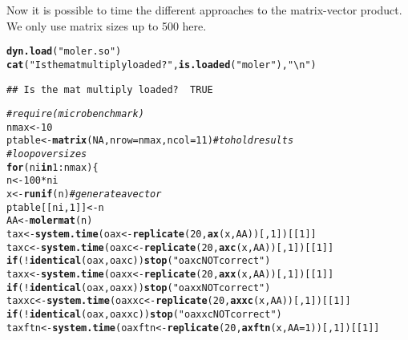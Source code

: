 \documentclass[10pt]{article}\usepackage[]{graphicx}\usepackage[]{color}
\makeatletter
\newcommand{\hlnum}[1]{\textcolor[rgb]{0.686,0.059,0.569}{#1}}%
\newcommand{\hlstr}[1]{\textcolor[rgb]{0.192,0.494,0.8}{#1}}%
\newcommand{\hlcom}[1]{\textcolor[rgb]{0.678,0.584,0.686}{\textit{#1}}}%
\newcommand{\hlopt}[1]{\textcolor[rgb]{0,0,0}{#1}}%
\newcommand{\hlstd}[1]{\textcolor[rgb]{0.345,0.345,0.345}{#1}}%
\newcommand{\hlkwa}[1]{\textcolor[rgb]{0.161,0.373,0.58}{\textbf{#1}}}%
\newcommand{\hlkwb}[1]{\textcolor[rgb]{0.69,0.353,0.396}{#1}}%
\newcommand{\hlkwc}[1]{\textcolor[rgb]{0.333,0.667,0.333}{#1}}%
\newcommand{\hlkwd}[1]{\textcolor[rgb]{0.737,0.353,0.396}{\textbf{#1}}}%
\newenvironment{kframe}{%
 \def\at@end@of@kframe{}%
 \ifinner\ifhmode%
  \def\at@end@of@kframe{\end{minipage}}%
  \begin{minipage}{\columnwidth}%
 \fi\fi%
 \def\FrameCommand##1{\hskip\@totalleftmargin \hskip-\fboxsep
 \colorbox{shadecolor}{##1}\hskip-\fboxsep
     \hskip-\linewidth \hskip-\@totalleftmargin \hskip\columnwidth}%
 \MakeFramed {\advance\hsize-\width
   \@totalleftmargin\z@ \linewidth\hsize
   \@setminipage}}%
 {\par\unskip\endMakeFramed%
 \at@end@of@kframe}
\newenvironment{knitrout}{}{} %
\makeatother
\begin{document}
Now it is possible to time the different approaches to the matrix-vector
product. We only use matrix sizes up to 500 here. 

\begin{knitrout}\scriptsize
{}\color{fgcolor}\begin{kframe}
\begin{alltt}
\hlkwd{dyn.load}\hlstd{(}\hlstr{"moler.so"}\hlstd{)}
\hlkwd{cat}\hlstd{(}\hlstr{"Is the mat multiply loaded? "}\hlstd{,}\hlkwd{is.loaded}\hlstd{(}\hlstr{"moler"}\hlstd{),}\hlstr{"\textbackslash{}n"}\hlstd{)}
\end{alltt}
\begin{verbatim}
## Is the mat multiply loaded?  TRUE
\end{verbatim}
\begin{alltt}
\hlcom{# require(microbenchmark)}
\hlstd{nmax}\hlkwb{<-}\hlnum{10}
\hlstd{ptable}\hlkwb{<-}\hlkwd{matrix}\hlstd{(}\hlnum{NA}\hlstd{,} \hlkwc{nrow}\hlstd{=nmax,} \hlkwc{ncol}\hlstd{=}\hlnum{11}\hlstd{)} \hlcom{# to hold results}
\hlcom{# loop over sizes}
\hlkwa{for} \hlstd{(ni} \hlkwa{in} \hlnum{1}\hlopt{:}\hlstd{nmax)\{}
  \hlstd{n}\hlkwb{<-}\hlnum{100}\hlopt{*}\hlstd{ni}
  \hlstd{x}\hlkwb{<-}\hlkwd{runif}\hlstd{(n)} \hlcom{# generate a vector }
  \hlstd{ptable[[ni,} \hlnum{1}\hlstd{]]}\hlkwb{<-}\hlstd{n}
  \hlstd{AA}\hlkwb{<-}\hlkwd{molermat}\hlstd{(n)}
  \hlstd{tax}\hlkwb{<-}\hlkwd{system.time}\hlstd{(oax}\hlkwb{<-}\hlkwd{replicate}\hlstd{(}\hlnum{20}\hlstd{,}\hlkwd{ax}\hlstd{(x, AA))[,}\hlnum{1}\hlstd{])[[}\hlnum{1}\hlstd{]]}
  \hlstd{taxc}\hlkwb{<-}\hlkwd{system.time}\hlstd{(oaxc}\hlkwb{<-}\hlkwd{replicate}\hlstd{(}\hlnum{20}\hlstd{,}\hlkwd{axc}\hlstd{(x, AA))[,}\hlnum{1}\hlstd{])[[}\hlnum{1}\hlstd{]]}
  \hlkwa{if} \hlstd{(}\hlopt{!} \hlkwd{identical}\hlstd{(oax, oaxc))} \hlkwd{stop}\hlstd{(}\hlstr{"oaxc NOT correct"}\hlstd{)}
  \hlstd{taxx}\hlkwb{<-}\hlkwd{system.time}\hlstd{(oaxx}\hlkwb{<-}\hlkwd{replicate}\hlstd{(}\hlnum{20}\hlstd{,}\hlkwd{axx}\hlstd{(x, AA))[,}\hlnum{1}\hlstd{])[[}\hlnum{1}\hlstd{]]}
  \hlkwa{if} \hlstd{(}\hlopt{!} \hlkwd{identical}\hlstd{(oax, oaxx))} \hlkwd{stop}\hlstd{(}\hlstr{"oaxx NOT correct"}\hlstd{)}
  \hlstd{taxxc}\hlkwb{<-}\hlkwd{system.time}\hlstd{(oaxxc}\hlkwb{<-}\hlkwd{replicate}\hlstd{(}\hlnum{20}\hlstd{,}\hlkwd{axxc}\hlstd{(x, AA))[,}\hlnum{1}\hlstd{])[[}\hlnum{1}\hlstd{]]}
  \hlkwa{if} \hlstd{(}\hlopt{!} \hlkwd{identical}\hlstd{(oax, oaxxc))} \hlkwd{stop}\hlstd{(}\hlstr{"oaxxc NOT correct"}\hlstd{)}
  \hlstd{taxftn}\hlkwb{<-}\hlkwd{system.time}\hlstd{(oaxftn}\hlkwb{<-}\hlkwd{replicate}\hlstd{(}\hlnum{20}\hlstd{,}\hlkwd{axftn}\hlstd{(x,} \hlkwc{AA}\hlstd{=}\hlnum{1}\hlstd{))[,}\hlnum{1}\hlstd{])[[}\hlnum{1}\hlstd{]]}

\end{alltt}
\end{kframe}
\end{knitrout}
\end{document}
